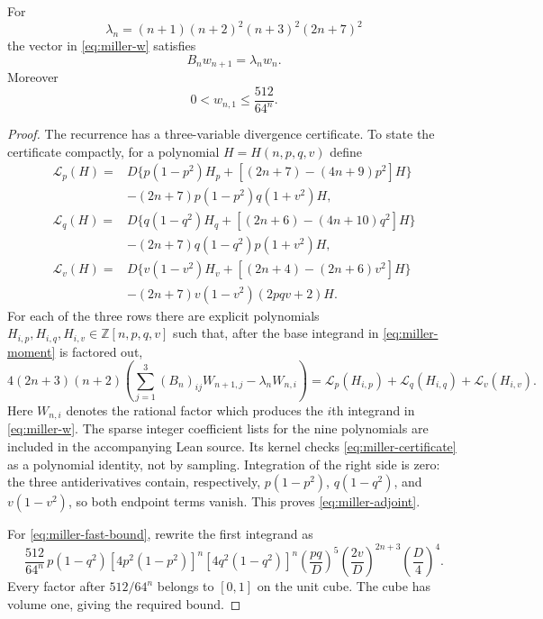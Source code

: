 \begin{lemma}\label{lem:miller-adjoint}
For
\[
 \lambda_n=(n+1)(n+2)^2(n+3)^2(2n+7)^2
\]
the vector in \eqref{eq:miller-w} satisfies
\begin{equation}\label{eq:miller-adjoint}
                 B_nw_{n+1}=\lambda_nw_n .
\end{equation}
Moreover
\begin{equation}\label{eq:miller-fast-bound}
             0<w_{n,1}\leq \frac{512}{64^n}.
\end{equation}
\end{lemma}

\begin{proof}
The recurrence has a three-variable divergence certificate.  To state the
certificate compactly, for a polynomial $H=H(n,p,q,v)$ define
\begin{align*}
\mathcal L_p(H)
={}&D\{p(1-p^2)H_p+[(2n+7)-(4n+9)p^2]H\}\\
 &-(2n+7)p(1-p^2)q(1+v^2)H,\\
\mathcal L_q(H)
={}&D\{q(1-q^2)H_q+[(2n+6)-(4n+10)q^2]H\}\\
 &-(2n+7)q(1-q^2)p(1+v^2)H,\\
\mathcal L_v(H)
={}&D\{v(1-v^2)H_v+[(2n+4)-(2n+6)v^2]H\}\\
 &-(2n+7)v(1-v^2)(2pqv+2)H.
\end{align*}
For each of the three rows there are explicit polynomials
$H_{i,p},H_{i,q},H_{i,v}\in\mathbb Z[n,p,q,v]$ such that, after the base
integrand in \eqref{eq:miller-moment} is factored out,
\begin{equation}\label{eq:miller-certificate}
 4(2n+3)(n+2)
 \left(\sum_{j=1}^3(B_n)_{ij}W_{n+1,j}
                  -\lambda_nW_{n,i}\right)
 =
 \mathcal L_p(H_{i,p})+\mathcal L_q(H_{i,q})
                         +\mathcal L_v(H_{i,v}).
\end{equation}
Here $W_{n,i}$ denotes the rational factor which produces the $i$th
integrand in \eqref{eq:miller-w}.  The sparse integer coefficient lists for
the nine polynomials are included in the accompanying Lean source.  Its
kernel checks \eqref{eq:miller-certificate} as a polynomial identity, not by
sampling.  Integration of the right side is zero: the three antiderivatives
contain, respectively, $p(1-p^2)$, $q(1-q^2)$, and $v(1-v^2)$, so both
endpoint terms vanish.  This proves \eqref{eq:miller-adjoint}.

For \eqref{eq:miller-fast-bound}, rewrite the first integrand as
\[
\frac{512}{64^n}\,p(1-q^2)
 [4p^2(1-p^2)]^n[4q^2(1-q^2)]^n
 \left(\frac{pq}{D}\right)^5
 \left(\frac{2v}{D}\right)^{2n+3}
 \left(\frac D4\right)^4 .
\]
Every factor after $512/64^n$ belongs to $[0,1]$ on the unit cube.
The cube has volume one, giving the required bound.
\end{proof}


